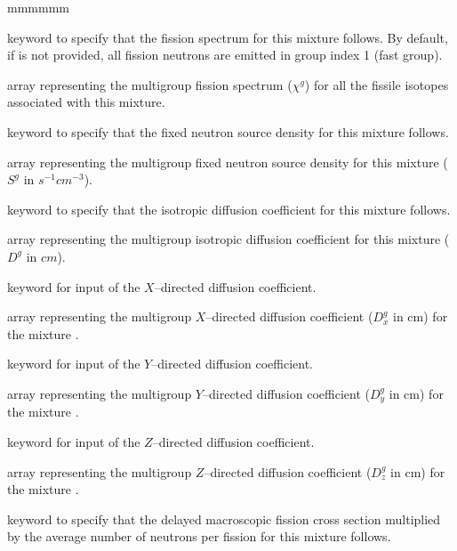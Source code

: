 \begin{ListeDeDescription}{mmmmmm}
\item[\moc{CHI}] keyword to specify that the fission spectrum for this mixture
follows. By default, if  is not provided, all fission neutrons are
emitted in group index 1 (fast group).

\item[\dusa{xschi}] array representing the multigroup fission spectrum
($\chi^{g}$) for all the fissile isotopes associated with this mixture.

\item[\moc{FIXE}] keyword to specify that the fixed neutron source density for
this mixture follows.

\item[\dusa{xsfixe}] array representing the multigroup fixed neutron source
density for this mixture ($S^{g}$ in $s^{-1}cm^{-3}$). 

\item[\moc{DIFF}] keyword to specify that the isotropic diffusion coefficient for
this mixture follows.

\item[\dusa{diff}] array representing the multigroup isotropic diffusion coefficient for
this mixture ($D^{g}$ in $cm$). 

\item[\moc{DIFFX}] keyword for input of the $X$--directed diffusion coefficient. 

\item[\dusa{xdiffx}] array representing the multigroup $X$--directed diffusion coefficient ($D^g_x$ in cm) for the mixture 
. 

\item[\moc{DIFFY}] keyword for input of the $Y$--directed diffusion coefficient. 

\item[\dusa{xdiffy}] array representing the multigroup $Y$--directed diffusion coefficient ($D^g_y$ in cm) for the mixture 
. 

\item[\moc{DIFFZ}] keyword for input of the $Z$--directed diffusion coefficient.

\item[\dusa{xdiffz}] array representing the multigroup $Z$--directed diffusion coefficient ($D^g_z$ in cm) for the mixture 
. 

\item[\moc{NUSIGD}] keyword to specify that the delayed macroscopic fission cross
section multiplied by the average number of neutrons per fission for this
mixture follows.


\end{ListeDeDescription}
